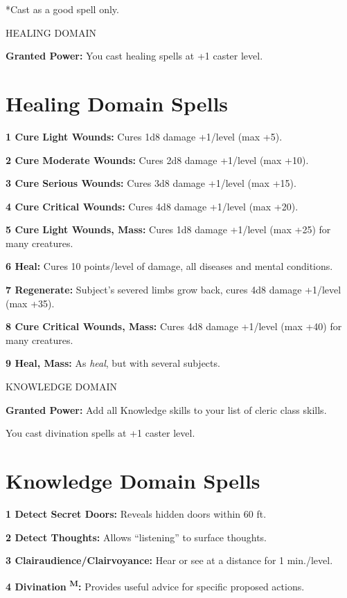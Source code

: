 \documentclass{article}
\begin{document}
*Cast as a good spell only.

\vspace{12pt}
HEALING DOMAIN

\textbf{Granted Power:} You cast healing spells at +1 caster level.

\section*{\textbf{Healing Domain Spells}}

\textbf{1 Cure Light Wounds: }Cures 1d8 damage +1/level (max +5).

\textbf{2 Cure Moderate Wounds: }Cures 2d8 damage +1/level (max +10).

\textbf{3 Cure Serious Wounds: }Cures 3d8 damage +1/level (max +15).

\textbf{4 Cure Critical Wounds: }Cures 4d8 damage +1/level (max +20).

\textbf{5 Cure Light Wounds, Mass: }Cures 1d8 damage +1/level (max +25) for many 
creatures.

\textbf{6 Heal: }Cures 10 points/level of damage, all diseases and mental conditions.

\textbf{7 Regenerate: }Subject's severed limbs grow back, cures 4d8 damage +1/level 
(max +35).

\textbf{8 Cure Critical Wounds, Mass: }Cures 4d8 damage +1/level (max +40) for 
many creatures.

\textbf{9 Heal, Mass:} As \textit{heal}, but with several subjects.

\vspace{12pt}
KNOWLEDGE DOMAIN

\textbf{Granted Power:} Add all Knowledge skills to your list of cleric class skills.

You cast divination spells at +1 caster level.

\section*{\textbf{Knowledge Domain Spells}}

\textbf{1 Detect Secret Doors:} Reveals hidden doors within 60 ft.

\textbf{2 Detect Thoughts: }Allows ``listening'' to surface thoughts.

\textbf{3 Clairaudience/Clairvoyance: }Hear or see at a distance for 1 min./level.

\textbf{4 Divination }\textsuperscript{\textbf{M}}\textbf{: }Provides useful advice 
for specific proposed actions.
\end{document}
